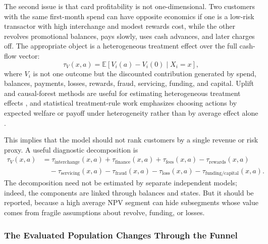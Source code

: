 \documentclass[11pt]{article}
\newcommand{\E}{\mathbb{E}}
\newcommand{\1}{\mathbf{1}}
\begin{document}
The second issue is that card profitability is not one-dimensional. Two
customers with the same first-month spend can have opposite economics if one is
a low-risk transactor with high interchange and modest rewards cost, while the
other revolves promotional balances, pays slowly, uses cash advances, and later
charges off. The appropriate object is a heterogeneous treatment effect over
the full cash-flow vector:
\begin{equation}
  \tau_{V}(x,a)
  =
  \E[V_i(a)-V_i(0)\mid X_i=x],
  \label{eq:value-cate}
\end{equation}
where $V_i$ is not one outcome but the discounted contribution generated by
spend, balances, payments, losses, rewards, fraud, servicing, funding, and
capital. Uplift and causal-forest methods are useful for estimating
heterogeneous treatment effects \citep{lo2002true,wager2018causalforests,chernozhukov2018dml},
and statistical treatment-rule work emphasizes choosing actions by expected
welfare or payoff under heterogeneity rather than by average effect alone
\citep{manski2004treatment}.

This implies that the model should not rank customers by a single revenue or
risk proxy. A useful diagnostic decomposition is
\begin{align}
  \tau_{V}(x,a)
  &=
  \tau_{\mathrm{interchange}}(x,a)
  + \tau_{\mathrm{finance}}(x,a)
  + \tau_{\mathrm{fees}}(x,a)
  - \tau_{\mathrm{rewards}}(x,a) \nonumber\\
  &\quad
  - \tau_{\mathrm{servicing}}(x,a)
  - \tau_{\mathrm{fraud}}(x,a)
  - \tau_{\mathrm{loss}}(x,a)
  - \tau_{\mathrm{funding/capital}}(x,a).
  \label{eq:value-cate-decomposition}
\end{align}
The decomposition need not be estimated by separate independent models; indeed,
the components are linked through balances and states. But it should be
reported, because a high average NPV segment can hide subsegments whose value
comes from fragile assumptions about revolve, funding, or losses.

\subsubsection{The Evaluated Population Changes Through the Funnel}
\label{subsec:funnel-population}
\end{document}
